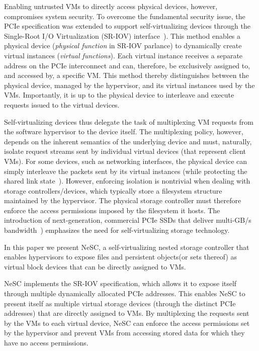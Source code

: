 Enabling untrusted VMs to directly access physical devices, however, compromises system security.
To overcome the fundamental security issue, the PCIe specification was extended to support self-virtualizing devices through the Single-Root I/O Virtualization (SR-IOV) interface~\cite{pcisigiov}).
This method enables a physical device (\emph{physical function} in SR-IOV parlance) to dynamically create virtual instances (\emph{virtual functions}). Each virtual instance receives a separate address on the PCIe interconnect and can, therefore, be exclusively assigned to, and accessed by, a specific VM. This method thereby distinguishes between the physical device, managed by the hypervisor, and its virtual instances used by the VMs.
%
Importantly, it is up to the physical device to interleave and execute requests issued to the virtual devices.

Self-virtualizing devices thus delegate the task of multiplexing VM requests from the software hypervisor to the device itself.
The multiplexing policy, however, depends on the inherent semantics of the underlying device and must, naturally, isolate request streams sent by individual virtual devices (that represent client VMs).
For some devices, such as networking interfaces, the physical device can simply interleave the packets sent by its virtual instances (while protecting the shared link state~\cite{smolyar15sriovsec}).
%
However, enforcing isolation is nontrivial when dealing with storage controllers/devices, which typically store a filesystem structure maintained by the hypervisor. The physical storage controller must therefore enforce the access permissions imposed by the filesystem it hosts.
%
The introduction of next-generation, commercial PCIe SSDs that deliver multi-GB/s bandwidth~\cite{intel-ssd,seagate16ssd}) emphasizes the need for self-virtualizing storage technology.

In this paper we present NeSC, a self-virtualizing nested storage controller that enables hypervisors to expose files and persistent objects\footnotemark (or sets thereof) as virtual block devices that can be directly assigned to VMs.

  NeSC implements the SR-IOV specification, which allows it to expose itself through multiple dynamically allocated PCIe addresses. This enables NeSC to present itself as multiple virtual storage devices (through the distinct PCIe addresses) that are directly assigned to VMs. By multiplexing the requests sent by the VMs to each virtual device, NeSC can enforce the access permissions set by the hypervisor and prevent VMs from  accessing stored data for which they have no access permissions.

